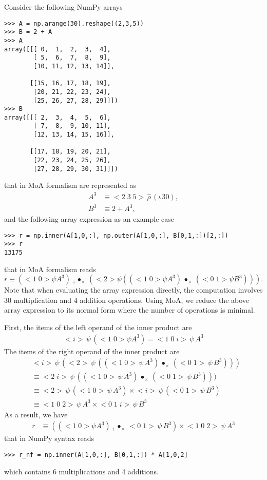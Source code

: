\documentclass[a4paper,12pt]{article}
\newcommand{\reshape}{\,\widehat{\rho}\,}         %
\newcommand{\range}{\iota\,}                      %
\newcommand{\vc}[1]{<#1>}                         %
\newcommand{\vcc}[2]{<#1\;#2>}                    %
\newcommand{\vccc}[3]{<#1\;#2\;#3>}               %
\newcommand{\outerprod}[1]{\,\bullet_{#1}\,}              %
\newcommand{\innerprod}[2]{\,{}_{#1}\!\!\bullet_{#2}\,}   %
\newcommand{\getitem}[2]{{#2}\,\psi\,{#1}}        %
\begin{document}
Consider the following NumPy arrays
\begin{verbatim}
>>> A = np.arange(30).reshape((2,3,5))
>>> B = 2 + A
>>> A
array([[[ 0,  1,  2,  3,  4],
        [ 5,  6,  7,  8,  9],
        [10, 11, 12, 13, 14]],

       [[15, 16, 17, 18, 19],
        [20, 21, 22, 23, 24],
        [25, 26, 27, 28, 29]]])
>>> B
array([[[ 2,  3,  4,  5,  6],
        [ 7,  8,  9, 10, 11],
        [12, 13, 14, 15, 16]],

       [[17, 18, 19, 20, 21],
        [22, 23, 24, 25, 26],
        [27, 28, 29, 30, 31]]])
\end{verbatim}
that in MoA formalism are represented as
\begin{align}
  A^3 &\equiv \vccc235\reshape(\range30), \\
  B^3 &\equiv 2+A^3,
\end{align}
and the following array expression as an example case
\begin{verbatim}
>>> r = np.inner(A[1,0,:], np.outer(A[1,0,:], B[0,1,:])[2,:])
>>> r
13175
\end{verbatim}
that in MoA formalism reads
\begin{equation}
r \equiv (\vcc10\psi A^3) \innerprod+\times (\vc2\psi((\vcc10\psi A^3) \outerprod\times (\vcc01\psi B^3))).
\end{equation}
Note that when evaluating the array expression directly, the
computation involves 30 multiplication and 4 addition
operations. Using MoA, we reduce the above array expression to its
normal form where the number of operations is minimal.

First, the items of the left operand of the inner product are
\begin{align*}
  \getitem{(\vcc10\psi A^3)}{\vc i} = \getitem{A^3}{\vccc10i}
\end{align*}
The items of the right operand of the inner product are
\begin{align}
&\getitem{
  (\getitem{((\getitem{A^3}{\vcc10}) \outerprod\times (\getitem{B^3}{\vcc01}))}{\vc2})
}{\vc i} \\
&\equiv \getitem{((\getitem{A^3}{\vcc10}) \outerprod\times (\getitem{B^3}{\vcc01})))}{\vcc2i} \\
&\equiv \getitem{(\getitem{A^3}{\vcc10})}{\vc2} \times \getitem{(\getitem{B^3}{\vcc01})}{\vc i}\\
&\equiv \getitem{A^3}{\vccc102} \times \getitem{B^3}{\vccc01i}
\end{align}
As a result, we have
\begin{align*}
  r &\equiv ((\vcc10\psi A^3) \innerprod+\times  \getitem{B^3}{\vcc01})\times\getitem{A^3}{\vccc102}
\end{align*}
that in NumPy syntax reads
\begin{verbatim}
>>> r_nf = np.inner(A[1,0,:], B[0,1,:]) * A[1,0,2]
\end{verbatim}
which contains 6 multiplications and 4 additions.
\end{document}

